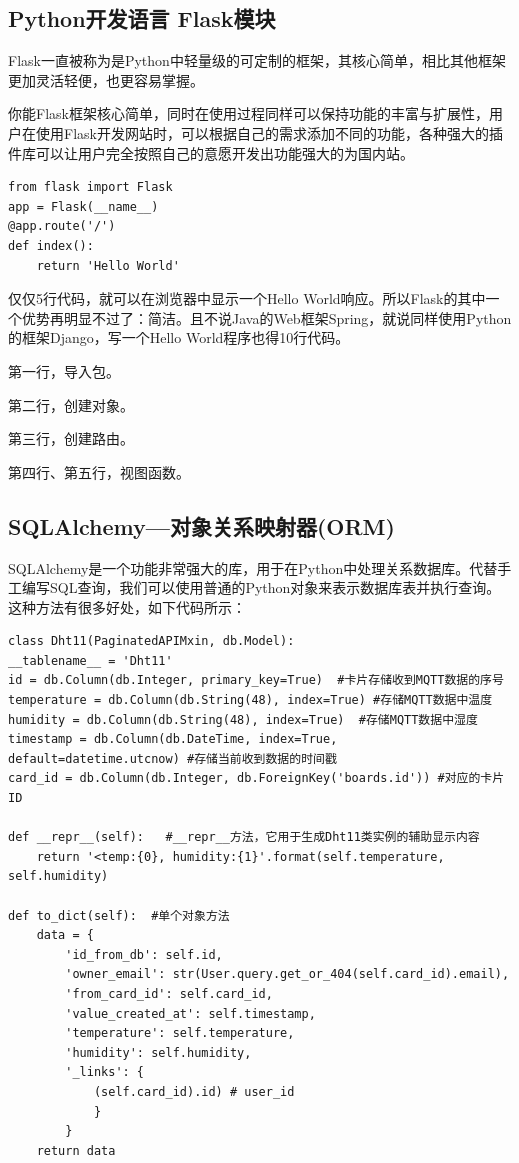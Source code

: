 \subsection{Python开发语言 Flask模块}

Flask一直被称为是Python中轻量级的可定制的框架，其核心简单，相比其他框架更加灵活轻便，也更容易掌握。

你能Flask框架核心简单，同时在使用过程同样可以保持功能的丰富与扩展性，用户在使用Flask开发网站时，可以根据自己的需求添加不同的功能，各种强大的插件库可以让用户完全按照自己的意愿开发出功能强大的为国内站。

\begin{lstlisting}[title=代码 3-1：Flask简单示例]
from flask import Flask
app = Flask(__name__)
@app.route('/')
def index():
    return 'Hello World'
\end{lstlisting}

仅仅5行代码，就可以在浏览器中显示一个Hello World响应。所以Flask的其中一个优势再明显不过了：简洁。且不说Java的Web框架Spring，就说同样使用Python的框架Django，写一个Hello World程序也得10行代码。

第一行，导入包。

第二行，创建对象。

第三行，创建路由。

第四行、第五行，视图函数。

\subsection{SQLAlchemy---对象关系映射器(ORM)}

SQLAlchemy是一个功能非常强大的库，用于在Python中处理关系数据库。代替手工编写SQL查询，我们可以使用普通的Python对象来表示数据库表并执行查询。这种方法有很多好处，如下代码所示：

\begin{lstlisting}[title=DHT11数据表对象数据表模型]
class Dht11(PaginatedAPIMxin, db.Model):
__tablename__ = 'Dht11'
id = db.Column(db.Integer, primary_key=True)  #卡片存储收到MQTT数据的序号
temperature = db.Column(db.String(48), index=True) #存储MQTT数据中温度
humidity = db.Column(db.String(48), index=True)  #存储MQTT数据中湿度
timestamp = db.Column(db.DateTime, index=True, default=datetime.utcnow) #存储当前收到数据的时间戳
card_id = db.Column(db.Integer, db.ForeignKey('boards.id')) #对应的卡片ID

def __repr__(self):   #__repr__方法，它用于生成Dht11类实例的辅助显示内容
	return '<temp:{0}, humidity:{1}'.format(self.temperature, self.humidity)

def to_dict(self):  #单个对象方法
	data = {
		'id_from_db': self.id,
		'owner_email': str(User.query.get_or_404(self.card_id).email),
		'from_card_id': self.card_id,
		'value_created_at': self.timestamp,
		'temperature': self.temperature,
		'humidity': self.humidity,
		'_links': {
			(self.card_id).id) # user_id
			}
		}
	return data
\end{lstlisting}

